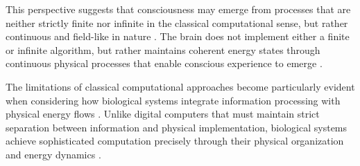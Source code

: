 This perspective suggests that consciousness may emerge from processes that are neither strictly finite nor infinite in the classical computational sense, but rather continuous and field-like in nature \cite{Barendregt1984}. The brain does not implement either a finite or infinite algorithm, but rather maintains coherent energy states through continuous physical processes that enable conscious experience to emerge \cite{Boolos2007}.

The limitations of classical computational approaches become particularly evident when considering how biological systems integrate information processing with physical energy flows \cite{Kozen2006}. Unlike digital computers that must maintain strict separation between information and physical implementation, biological systems achieve sophisticated computation precisely through their physical organization and energy dynamics \cite{Mancosu2008}.